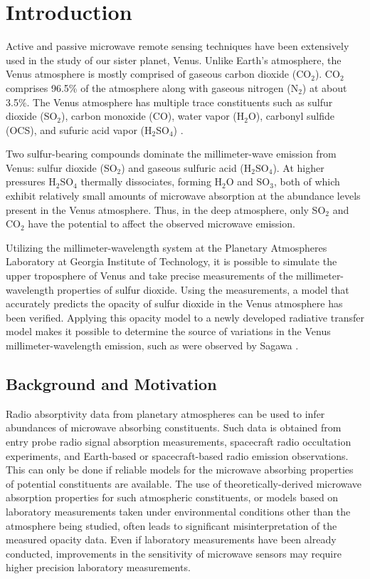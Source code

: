 \chapter{Introduction}

Active and passive microwave remote sensing techniques have been extensively used in the study of our sister planet, Venus. Unlike Earth's atmosphere, the Venus atmosphere is mostly comprised of gaseous carbon dioxide (CO$_2$). CO$_2$ comprises 96.5\% of the atmosphere along with gaseous nitrogen (N$_2$) at about 3.5\%. The Venus atmosphere has multiple trace constituents such as sulfur dioxide (SO$_2$), carbon monoxide (CO), water vapor (H$_2$O), carbonyl sulfide (OCS), and sufuric acid vapor (H$_2$SO$_4$) \cite{Suleiman-thesis}.

Two sulfur-bearing compounds dominate the millimeter-wave emission from Venus: sulfur dioxide (SO$_2$) and gaseous sulfuric acid (H$_2$SO$_4$). At higher pressures H$_2$SO$_4$ thermally dissociates, forming H$_2$O and SO$_3$, both of which exhibit relatively small amounts of microwave absorption at the abundance levels present in the Venus atmosphere. Thus, in the deep atmosphere, only SO$_2$ and CO$_2$ have the potential to affect the observed microwave emission.

Utilizing the millimeter-wavelength system at the Planetary Atmospheres Laboratory at Georgia Institute of Technology, it is possible to simulate the upper troposphere of Venus and take precise measurements of the millimeter-wavelength properties of sulfur dioxide. Using the measurements, a model that accurately predicts the opacity of sulfur dioxide in the Venus atmosphere has been verified. Applying this opacity model to a newly developed radiative transfer model makes it possible to determine the source of variations in the Venus millimeter-wavelength emission, such as were observed by Sagawa \cite{Sagawa-2008}.

\section{Background and Motivation}

Radio absorptivity data from planetary atmospheres can be used to infer abundances of microwave absorbing constituents. Such data is obtained from entry probe radio signal absorption measurements, spacecraft radio occultation experiments, and Earth-based or spacecraft-based radio emission observations. This can only be done if reliable models for the microwave absorbing properties of potential constituents are available. The use of theoretically-derived microwave absorption properties for such atmospheric constituents, or models based on laboratory measurements taken under environmental conditions other than the atmosphere being studied, often leads to significant misinterpretation of the measured opacity data. Even if laboratory measurements have been already conducted, improvements in the sensitivity of microwave sensors may require higher precision laboratory measurements. 

